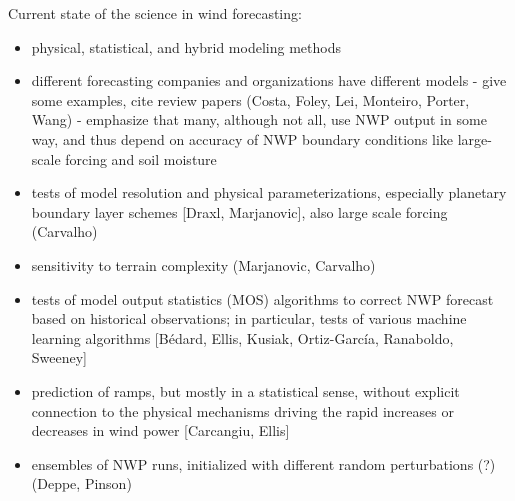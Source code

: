 Current state of the science in wind forecasting:
\begin{itemize}
\item physical, statistical, and hybrid modeling methods
\item different forecasting companies and organizations have different models - give some examples, cite review papers (Costa, Foley, Lei, Monteiro, Porter, Wang) - emphasize that many, although not all, use NWP output in some way, and thus depend on accuracy of NWP boundary conditions like large-scale forcing and soil moisture
\item tests of model resolution and physical parameterizations, especially planetary boundary layer schemes [Draxl, Marjanovic], also large scale forcing (Carvalho)
\item sensitivity to terrain complexity (Marjanovic, Carvalho)
\item tests of model output statistics (MOS) algorithms to correct NWP forecast based on historical observations; in particular, tests of various machine learning algorithms [B\'edard, Ellis, Kusiak, Ortiz-Garc\'ia, Ranaboldo, Sweeney]
\item prediction of ramps, but mostly in a statistical sense, without explicit connection to the physical mechanisms driving the rapid increases or decreases in wind power [Carcangiu, Ellis]
\item ensembles of NWP runs, initialized with different random perturbations (?) (Deppe, Pinson)
\end{itemize}


